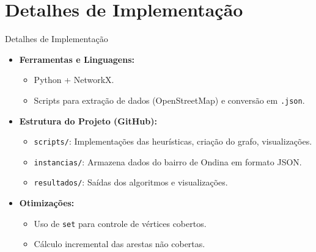 \documentclass[aspectratio=169,xcolor=table]{beamer}
\begin{document}
\section{Detalhes de Implementação}
\begin{frame}{Detalhes de Implementação}
    \begin{itemize}
        \item \textbf{Ferramentas e Linguagens:}
        \begin{itemize}
            \item Python + NetworkX.
            \item Scripts para extração de dados (OpenStreetMap) e conversão em \texttt{.json}.
        \end{itemize}
        \item \textbf{Estrutura do Projeto (GitHub):}
        \begin{itemize}
            \item \texttt{scripts/}: Implementações das heurísticas, criação do grafo, visualizações.
            \item \texttt{instancias/}: Armazena dados do bairro de Ondina em formato JSON.
            \item \texttt{resultados/}: Saídas dos algoritmos e visualizações.
        \end{itemize}
        \item \textbf{Otimizações:}
        \begin{itemize}
            \item Uso de \texttt{set} para controle de vértices cobertos.
            \item Cálculo incremental das arestas não cobertas.
        \end{itemize}
    \end{itemize}
\end{frame}

\end{document}
